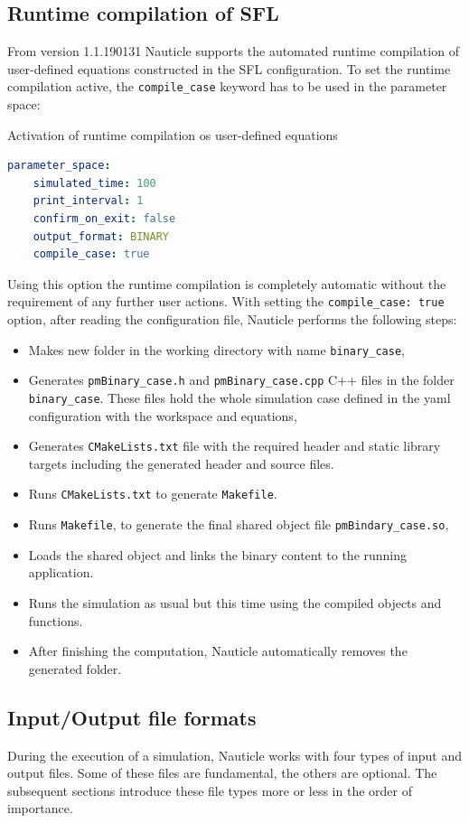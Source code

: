 \documentclass[a4paper,12pt,openany]{book}
\theoremstyle{break}
\begin{document}
\subsection{Runtime compilation of SFL}
From version 1.1.190131 Nauticle supports the automated runtime compilation of user-defined equations constructed in the SFL configuration. To set the runtime compilation active, the \texttt{compile\_case} keyword has to be used in the parameter space:
\begin{example}{Activation of runtime compilation os user-defined equations}{}
\lstset{basicstyle=\tiny}
\begin{lstlisting}[language=YAML]
  parameter_space: 
    simulated_time: 100
    print_interval: 1
    confirm_on_exit: false
    output_format: BINARY
    compile_case: true
\end{lstlisting}
\end{example}
Using this option the runtime compilation is completely automatic without the requirement of any further user actions. With setting the \texttt{compile\_case: true} option, after reading the configuration file, Nauticle performs the following steps:
\begin{itemize}
  \item Makes new folder in the working directory with name \texttt{binary\_case},
  \item Generates \texttt{pmBinary\_case.h} and \texttt{pmBinary\_case.cpp} C++ files in the folder \texttt{binary\_case}. These files hold the whole simulation case defined in the yaml configuration with the workspace and equations,
  \item Generates \texttt{CMakeLists.txt} file with the required header and static library targets including the generated header and source files.
  \item Runs \texttt{CMakeLists.txt} to generate \texttt{Makefile}.
  \item Runs \texttt{Makefile}, to generate the final shared object file \texttt{pmBindary\_case.so},
  \item Loads the shared object and links the binary content to the running application.
  \item Runs the simulation as usual but this time using the compiled objects and functions.
  \item After finishing the computation, Nauticle automatically removes the generated folder.
\end{itemize}

\subsection{Input/Output file formats}
During the execution of a simulation, Nauticle works with four types of input and output files. Some of these files are fundamental, the others are optional. The subsequent sections introduce these file types more or less in the order of importance.
\end{document}
